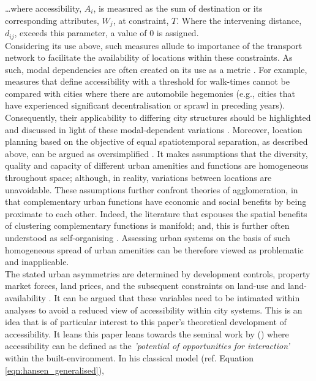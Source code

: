 \ldots where accessibility, $A_{i}$, is measured as the sum of destination or its corresponding attributes, $W_{j}$, at constraint, $T$. Where the intervening distance, $d_{ij}$, exceeds this parameter, a value of 0 is assigned.\\

Considering its use above, such measures allude to importance of the transport network to facilitate the availability of locations within these constraints. As such, modal dependencies are often created on its use as a metric \citep{mcneil2011bikeability,o2012spatial}. For example, measures that define accessibility with a threshold for walk-times cannot be compared with cities where there are automobile hegemonies (e.g., cities that have experienced significant decentralisation or sprawl in preceding years). Consequently, their applicability to differing city structures should be highlighted and discussed in light of these modal-dependent variations \citep{o2012spatial,miller2018accessibility}. Moreover, location planning based on the objective of equal spatiotemporal separation, as described above, can be argued as oversimplified \citep{nelson1993assessing,van1999accessibility}. It makes assumptions that the diversity, quality and capacity of different urban amenities and functions are homogeneous throughout space; although, in reality, variations between locations are unavoidable. These assumptions further confront theories of agglomeration, in that complementary urban functions have economic and social benefits by being proximate to each other. Indeed, the literature that espouses the spatial benefits of clustering complementary functions is manifold; and, this is further often understood as self-organising \citep{duranton2004micro, batty2012urban}. Assessing urban systems on the basis of such homogeneous spread of urban amenities can be therefore viewed as problematic and inapplicable.\\

The stated urban asymmetries are determined by development controls, property market forces, land prices, and the subsequent constraints on land-use and land-availability \citep{ingram1971concept, black1977accessibility}. It can be argued that these variables need to be intimated within analyses to avoid a reduced view of accessibility within city systems. This is an idea that is of particular interest to this paper's theoretical development of accessibility. It leans this paper leans towards the seminal work by \citeauthor{hansen1959accessibility} (\citeyear[p.4]{hansen1959accessibility}) where accessibility can be defined as the \textit{'potential of opportunities for interaction'} within the built-environment. In his classical model (ref. Equation \ref{eqn:hansen_generalised}),

